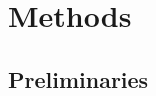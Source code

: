 \documentclass[12pt]{article}
\begin{document}
\section{Methods}\label{sec:methods}

\subsection{Preliminaries}\label{sec:preliminaries}
%
%
\end{document}
